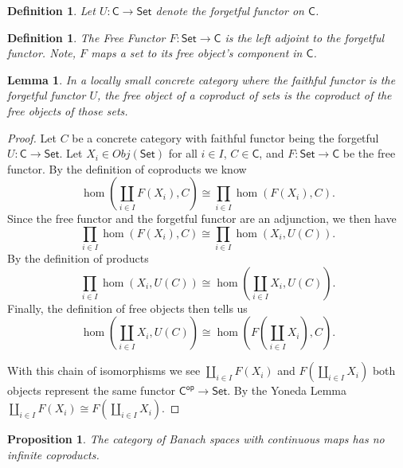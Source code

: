 \documentclass{article}
\newtheorem{proposition}[subsection]{Proposition}
\newtheorem{lemma}[subsection]{Lemma}
\newtheorem{definition}[subsection]{Definition}
\begin{document}
\begin{center}
\end{center}

\begin{definition}
	Let $U:\textsf{C}\xrightarrow{}\textsf{Set}$ denote the forgetful functor on $\textsf{C}$.
\end{definition}

\begin{definition}
	The \textit{Free Functor} $F:\textsf{Set}\xrightarrow{}\textsf{C}$ is the left adjoint to the forgetful functor.
	Note, $F$ maps a set to its free object's component in $\textsf{C}$.
\end{definition}
\begin{lemma}\label{l}
	In a locally small concrete category where the faithful functor is the forgetful functor $U$, the free object of a coproduct of sets is the coproduct of the free objects of those sets. 
\end{lemma}
\begin{proof}
	Let $C$ be a concrete category with faithful functor being the forgetful $U:\textsf{C}\xrightarrow{}\textsf{Set}$.
	Let $X_i\in Obj(\textsf{Set})$ for all $i\in I$, $C\in \textsf{C}$, and $F:\textsf{Set}\xrightarrow{}\textsf{C}$ be the free functor.
	By the definition of coproducts we know $$\hom(\coprod_{i\in I} F(X_i), C) 
	\cong \prod_{i\in I} \hom(F(X_i),C).$$
	Since the free functor and the forgetful functor are an adjunction, we then have $$\prod_{i\in I} \hom(F(X_i),C) \cong \prod_{i\in I} \hom(X_i,U(C)).$$
	By the definition of products $$\prod_{i\in I} \hom(X_i,U(C)) \cong \hom(\coprod_{i\in I} X_i, U(C)).$$
	Finally, the definition of free objects then tells us $$\hom(\coprod_{i\in I} X_i, U(C)) \cong \hom(F(\coprod_{i\in I}X_i),C).$$
	
	With this chain of isomorphisms we see $\coprod_{i\in I} F(X_i)$ and $F(\coprod_{i\in I}X_i)$ both objects represent the same functor $\textsf{C}^{\textsf{op}} \xrightarrow{}\textsf{Set}$.
	By the Yoneda Lemma $\coprod_{i\in I} F(X_i) \cong F(\coprod_{i\in I}X_i)$.
\end{proof}

\begin{proposition}
	The category of Banach spaces with \textit{continuous maps} has no infinite coproducts.
\end{proposition}
\end{document}
